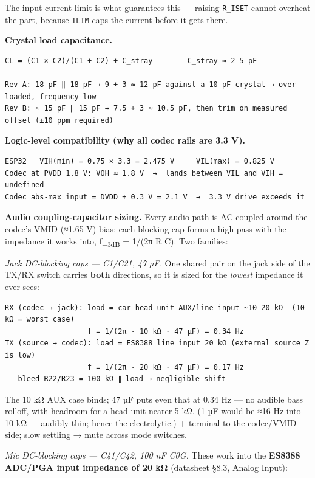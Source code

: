 \documentclass[11pt]{article}
\begin{document}
The input current limit is what guarantees this — raising \texttt{R_ISET} cannot overheat the part,
because \texttt{ILIM} caps the current before it gets there.

\textbf{Crystal load capacitance.}

\begin{Verbatim}
CL = (C1 × C2)/(C1 + C2) + C_stray        C_stray ≈ 2–5 pF

Rev A: 18 pF ‖ 18 pF → 9 + 3 ≈ 12 pF against a 10 pF crystal → over-loaded, frequency low
Rev B: ≈ 15 pF ‖ 15 pF → 7.5 + 3 ≈ 10.5 pF, then trim on measured offset (±10 ppm required)
\end{Verbatim}

\textbf{Logic-level compatibility (why all codec rails are 3.3 V).}

\begin{Verbatim}
ESP32   VIH(min) = 0.75 × 3.3 = 2.475 V     VIL(max) = 0.825 V
Codec at PVDD 1.8 V: VOH ≈ 1.8 V  →  lands between VIL and VIH = undefined
Codec abs-max input = DVDD + 0.3 V = 2.1 V  →  3.3 V drive exceeds it
\end{Verbatim}

\textbf{Audio coupling-capacitor sizing.} Every audio path is AC-coupled around the codec's VMID
(≈1.65 V) bias; each blocking cap forms a high-pass with the impedance it works into,
f\textsubscript{−3dB} = 1/(2π R C). Two families:

\emph{Jack DC-blocking caps — C1/C21, 47 µF.} One shared pair on the jack side of the TX/RX switch
carries \textbf{both} directions, so it is sized for the \emph{lowest} impedance it ever sees:

\begin{Verbatim}
RX (codec → jack): load = car head-unit AUX/line input ~10–20 kΩ  (10 kΩ = worst case)
                   f = 1/(2π · 10 kΩ · 47 µF) = 0.34 Hz
TX (source → codec): load = ES8388 line input 20 kΩ (external source Z is low)
                   f = 1/(2π · 20 kΩ · 47 µF) = 0.17 Hz
   bleed R22/R23 = 100 kΩ ∥ load → negligible shift
\end{Verbatim}

The 10 kΩ AUX case binds; 47 µF puts even that at 0.34 Hz — no audible bass rolloff, with headroom
for a head unit nearer 5 kΩ. (1 µF would be ≈16 Hz into 10 kΩ — audibly thin; hence the
electrolytic.) + terminal to the codec/VMID side; slow settling → mute across mode switches.

\emph{Mic DC-blocking caps — C41/C42, 100 nF C0G.} These work into the \textbf{ES8388 ADC/PGA input
impedance of 20 kΩ} (datasheet §8.3, Analog Input):
\end{document}
